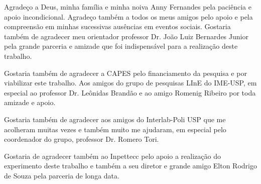 \documentclass[
	12pt,				%
	oneside,			%
	a4paper,			%
	english,			%
	brazil				%
	]{abntex2ppgsi}
\begin{document}
%
% 
%
\begin{agradecimentos}

Agradeço a Deus, minha família e minha noiva Anny Fernandes pela paciência e apoio incondicional. Agradeço também a todos os meus amigos pelo apoio e pela compreensão em minhas sucessivas ausências em eventos sociais. Gostaria também de agradecer meu orientador professor Dr. João Luiz Bernardes Junior pela grande parceria e amizade que foi indispensável para a realização deste trabalho.

Gostaria também de agradecer a CAPES pelo financiamento da pesquisa e por viabilizar este trabalho. Aos amigos do grupo de pesquisas LInE do IME-USP, em especial ao professor Dr. Leônidas Brandão e ao amigo Romenig Ribeiro por toda amizade e apoio.

Gostaria também de agradecer aos amigos do Interlab-Poli USP que me acolheram muitas vezes e também muito me ajudaram, em especial pelo coordenador do grupo, professor Dr. Romero Tori.

Gostaria de agradecer também ao Inpettecc pelo apoio a realização do experimento deste trabalho e também a seu diretor e grande amigo Elton Rodrigo de Souza pela parceria de longa data.

\end{agradecimentos}

%
% 

\end{document}

